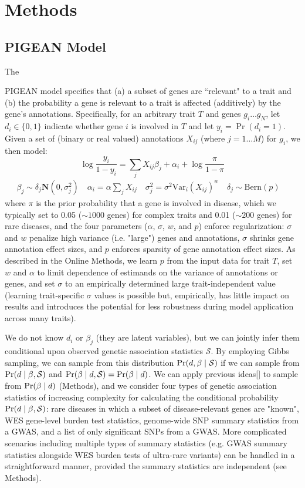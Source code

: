 \section{Methods}\label{sec:methods}

\subsection{PIGEAN Model}
\hypertarget{pigeanpior}{The} PIGEAN model specifies that (a) a subset of genes are ``relevant" to a trait and (b) the probability a gene is relevant to a trait is affected (additively) by the gene's annotations. Specifically, for an arbitrary trait $T$ and genes $g_i\ldots g_N$, let $d_i \in\{0,1\}$ indicate whether gene $i$ is involved in $T$ and let $y_i=\Pr(d_i=1)$. Given a set of (binary or real valued) annotations $X_{ij}$ (where $j=1\dots M$) for $g_i$, we then model:
\[
\log\frac{y_i}{1-y_i} = \sum_j X_{ij}\beta_j + \alpha_i + \log\frac{\pi}{1-\pi} 
\]
\begin{align*}
\beta_j \sim \delta_j\mathbf{N}(0, \sigma_j^2) \quad
\alpha_i = \alpha\sum_j X_{ij} \quad
\sigma_j^2 = \sigma^2\text{Var}_i(X_{ij})^w \quad
\delta_j \sim \text{Bern}(p) \quad
\end{align*}
where $\pi$ is the prior probability that a gene is involved in disease, which we typically set to 0.05 ($\sim 1000$ genes) for complex traits and 0.01 ($\sim 200$ genes) for rare diseases, and the four parameters ($\alpha$, $\sigma$, $w$, and $p$) enforce regularization: $\sigma$ and $w$ penalize high variance (i.e. "large") genes and annotations, $\sigma$ shrinks gene annotation effect sizes, and $p$ enforces sparsity of gene annotation effect sizes. As described in the Online Methods, we learn $p$ from the input data for trait $T$, set $w$ and $\alpha$ to limit dependence of estimands on the variance of annotations or genes, and set $\sigma$ to an empirically determined large trait-independent value (learning trait-specific $\sigma$ values is possible but, empirically, has little impact on results and introduces the potential for less robustness during model application across many traits).

We do not know $d_i$ or $\beta_j$ (they are latent variables), but we can jointly infer them conditional upon observed genetic association statistics $\mathcal{S}$. By employing Gibbs sampling, we can sample from this distribution $\text{Pr}(d, \beta \mid \mathcal{S})$ if we can sample from $\text{Pr}(d \mid \beta, \mathcal{S})$ and $\text{Pr}(\beta \mid d, \mathcal{S})=\text{Pr}(\beta \mid d)$. We can apply previous ideas[] to sample from $\text{Pr}(\beta \mid d)$ (Methods), and we consider four types of genetic association statistics of increasing complexity for calculating the conditional probability $\text{Pr}(d \mid \beta, \mathcal{S})$: rare diseases in which a subset of disease-relevant genes are "known", WES gene-level burden test statistics, genome-wide SNP summary statistics from a GWAS, and a list of only significant SNPs from a GWAS. More complicated scenarios including multiple types of summary statistics (e.g. GWAS summary statistics alongside WES burden tests of ultra-rare variants) can be handled in a straightforward manner, provided the summary statistics are independent (see Methods).

